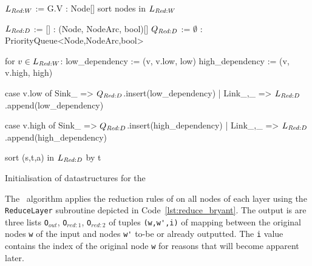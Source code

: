 \begin{lstfloat}[ht!]
  \centering

  \begin{blstlisting}
  $\ReduceLwork$ := G.V : Node[]
  sort nodes in $\ReduceLwork$

  $\ReduceLdep$ := [] : (Node, NodeArc, bool)[]
  $\ReduceQdep$ := $\emptyset$ : PriorityQueue<Node,NodeArc,bool>

  for $v \in \ReduceLwork$:
      low_dependency := (v, v.low, low)
      high_dependency := (v, v.high, high)

      case v.low of Sink{_}   => $\ReduceQdep$.insert(low_dependency)
                  | Link{_,_} => $\ReduceLdep$.append(low_dependency)

      case v.high of Sink{_}   => $\ReduceQdep$.insert(high_dependency)
                   | Link{_,_} => $\ReduceLdep$.append(high_dependency)

  sort (s,t,a) in $\ReduceLdep$ by t
  \end{blstlisting}

  \caption{Initialisation of datastructures for the \Reduce}
  \label{lst:reduce_init}
\end{lstfloat}

The \Reduce\ algorithm applies the reduction rules of \textcite{Bryant86} on all
nodes of each layer using the \lstinline{ReduceLayer} subroutine depicted in
Code~\ref{lst:reduce_bryant}. The output is are three lists
\lstinline{O}$_{\mathit{out}}$, \lstinline{O}$_{\mathit{red:}1}$,
\lstinline{O}$_{\mathit{red:}2}$ of tuples \lstinline{(w,w',i)} of mapping
between the original nodes \lstinline{w} of the input and nodes \lstinline{w'}
to-be or already outputted. The \lstinline{i} value contains the index of the
original node \lstinline{w} for reasons that will become apparent later.

